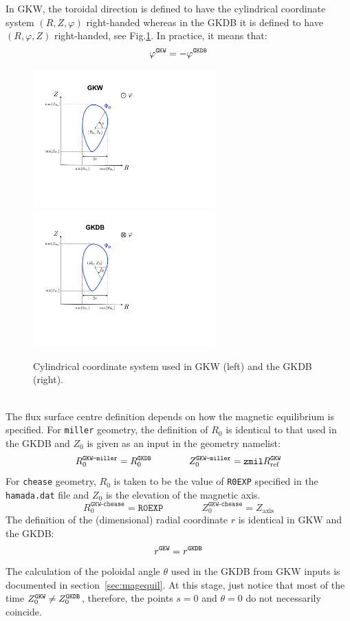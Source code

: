 \documentclass[a4paper]{report}
\begin{document}
In GKW, the toroidal direction is defined to have the cylindrical coordinate system $(R,Z,\varphi)$ right-handed whereas in the GKDB it is defined to have $(R,\varphi,Z)$ right-handed, see Fig.\ref{fig:coord1}. In practice, it means that: 
\begin{equation}
\varphi^{\texttt{GKW}}=-\varphi^{\texttt{GKDB}}
\end{equation}
\begin{figure}[h]
	\begin{center}
		\includegraphics[width=7cm]{GKW_coord.pdf}
		\includegraphics[width=7cm]{GKDB_coord.pdf}
		\caption{\label{fig:coord1} Cylindrical coordinate system used in GKW (left) and the GKDB (right).}
	\end{center}
\end{figure}\\
The flux surface centre definition depends on how the magnetic equilibrium is specified. For \texttt{miller} geometry, the definition of $R_0$ is identical to that used in the GKDB and $Z_0$ is given as an input in the geometry namelist:
\begin{equation}
R_0^\texttt{GKW-miller} = R_0^{\texttt{GKDB}} \qquad \qquad Z_0^\texttt{GKW-miller} = \texttt{zmil}R_{\textrm{ref}}^{\texttt{GKW}}
\end{equation}
For \texttt{chease} geometry, $R_0$ is taken to be the value of \texttt{R0EXP} specified in the \texttt{hamada.dat} file and $Z_0$ is the elevation of the magnetic axis.
\begin{equation}
R_0^\texttt{GKW-chease} = \texttt{R0EXP} \qquad \qquad Z_0^\texttt{GKW-chease} = Z_\textrm{axis}
\end{equation}
The definition of the (dimensional) radial coordinate $r$ is identical in GKW and the GKDB:
\begin{equation}
r^{\texttt{GKW}} = r^{\texttt{GKDB}}
\end{equation}
The calculation of the  poloidal angle $\theta$ used in the GKDB from GKW inputs is documented in section~\ref{sec:magequil}. At this stage, just notice that most of the time $Z_0^{\texttt{GKW}}\neq Z_0^{\texttt{GKDB}}$, therefore, the points $s=0$ and $\theta=0$ do not necessarily coincide. 
\end{document}
